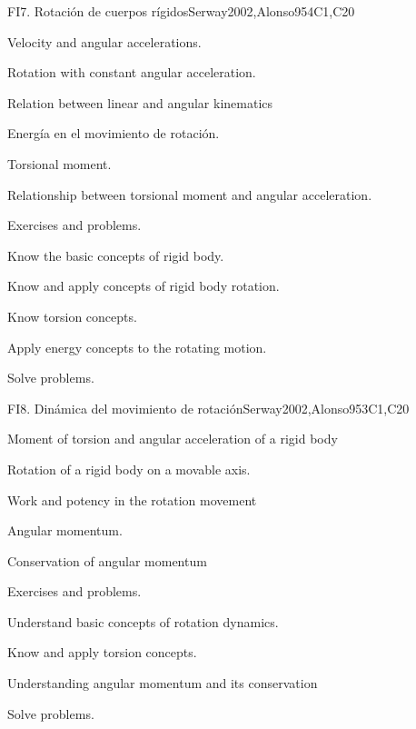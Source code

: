 \begin{syllabus}
\begin{unit}{FI7. Rotación de cuerpos rígidos}{}{Serway2002,Alonso95}{4}{C1,C20}
\begin{topics}
      \item Velocity and angular accelerations.
      \item Rotation with constant angular acceleration.
      \item Relation between linear and angular kinematics
      \item Energía en el movimiento de rotación.
      \item Torsional moment.
      \item Relationship between torsional moment and angular acceleration.
      \item Exercises and problems.
   \end{topics}

   \begin{learningoutcomes}
      \item Know the basic concepts of rigid body.
      \item Know and apply concepts of rigid body rotation.
      \item Know torsion concepts.
      \item Apply energy concepts to the rotating motion.
      \item Solve problems.
   \end{learningoutcomes}
\end{unit}

\begin{unit}{FI8. Dinámica del movimiento de rotación}{}{Serway2002,Alonso95}{3}{C1,C20}
\begin{topics}
      \item Moment of torsion and angular acceleration of a rigid body
      \item Rotation of a rigid body on a movable axis.
      \item Work and potency in the rotation movement
      \item Angular momentum.
      \item Conservation of angular momentum
      \item Exercises and problems.
    \end{topics}

   \begin{learningoutcomes}
      \item Understand basic concepts of rotation dynamics.
      \item Know and apply torsion concepts.
      \item Understanding angular momentum and its conservation
      \item Solve problems.
   \end{learningoutcomes}
\end{unit}

\begin{coursebibliography}
\end{coursebibliography}
\end{syllabus}

